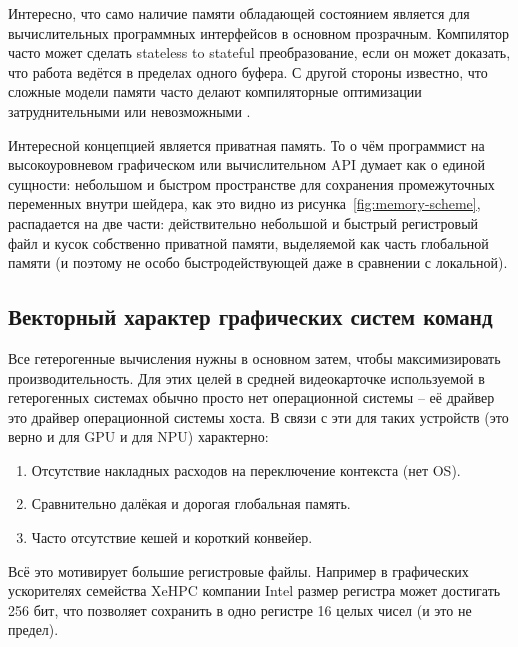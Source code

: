 Интересно, что само наличие памяти обладающей состоянием является для вычислительных программных интерфейсов в основном прозрачным. Компилятор часто может сделать stateless to stateful преобразование, если он может доказать, что работа ведётся в пределах одного буфера. С другой стороны известно, что сложные модели памяти часто делают компиляторные оптимизации затруднительными или невозможными \cite{vafeiadis2015common}.

Интересной концепцией является приватная память. То о чём программист на высокоуровневом графическом или вычислительном API думает как о единой сущности: небольшом и быстром пространстве для сохранения промежуточных переменных внутри шейдера, как это видно из рисунка~\ref{fig:memory-scheme}, распадается на две части: действительно небольшой и быстрый регистровый файл и кусок собственно приватной памяти, выделяемой как часть глобальной памяти (и поэтому не особо быстродействующей даже в сравнении с локальной).

\subsection{Векторный характер графических систем команд}\label{subsec:overview/logical/hw}

Все гетерогенные вычисления нужны в основном затем, чтобы максимизировать производительность.
Для этих целей в средней видеокарточке используемой в гетерогенных системах обычно просто нет операционной системы -- её драйвер это драйвер операционной системы хоста.
В связи с эти для таких устройств (это верно и для GPU и для NPU) характерно:

\begin{enumerate}
\item Отсутствие накладных расходов на переключение контекста (нет OS).
\item Сравнительно далёкая и дорогая глобальная память.
\item Часто отсутствие кешей и короткий конвейер.
\end{enumerate}

Всё это мотивирует большие регистровые файлы. Например в графических ускорителях семейства XeHPC компании Intel размер регистра может достигать 256 бит, что позволяет сохранить в одно регистре 16 целых чисел (и это не предел).

